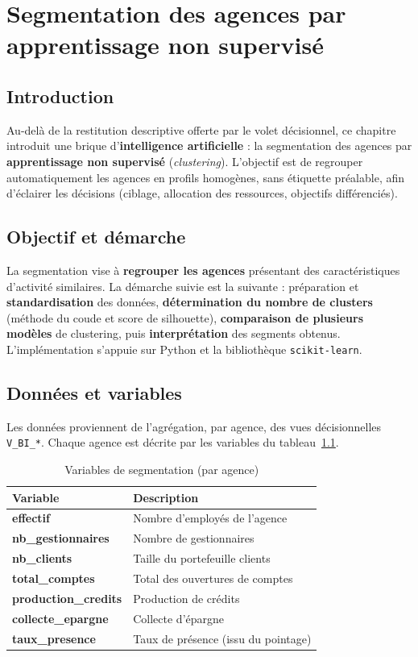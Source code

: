 \chapter{Segmentation des agences par apprentissage non supervisé}

\section*{Introduction}
Au-delà de la restitution descriptive offerte par le volet décisionnel, ce
chapitre introduit une brique d'\textbf{intelligence artificielle} : la
segmentation des agences par \textbf{apprentissage non supervisé} (\emph{clustering}).
L'objectif est de regrouper automatiquement les agences en profils homogènes,
sans étiquette préalable, afin d'éclairer les décisions (ciblage, allocation des
ressources, objectifs différenciés).

\section{Objectif et démarche}
La segmentation vise à \textbf{regrouper les agences} présentant des
caractéristiques d'activité similaires. La démarche suivie est la suivante :
préparation et \textbf{standardisation} des données, \textbf{détermination du
nombre de clusters} (méthode du coude et score de silhouette), \textbf{comparaison
de plusieurs modèles} de clustering, puis \textbf{interprétation} des segments
obtenus. L'implémentation s'appuie sur Python et la bibliothèque
\texttt{scikit-learn}.

\section{Données et variables}
Les données proviennent de l'agrégation, par agence, des vues décisionnelles
\texttt{V\_BI\_*}. Chaque agence est décrite par les variables du
tableau~\ref{tab:variables_clustering}.

\begin{table}[htbp]
\centering
\caption{Variables de segmentation (par agence)}
\label{tab:variables_clustering}
\renewcommand{\arraystretch}{1.2}
\begin{tabularx}{\textwidth}{>{\bfseries}p{4cm}X}
\toprule
\textmd{\textbf{Variable}} & \textbf{Description}\\
\midrule
effectif & Nombre d'employés de l'agence\\
nb\_gestionnaires & Nombre de gestionnaires\\
nb\_clients & Taille du portefeuille clients\\
total\_comptes & Total des ouvertures de comptes\\
production\_credits & Production de crédits\\
collecte\_epargne & Collecte d'épargne\\
taux\_presence & Taux de présence (issu du pointage)\\
\bottomrule
\end{tabularx}
\end{table}

